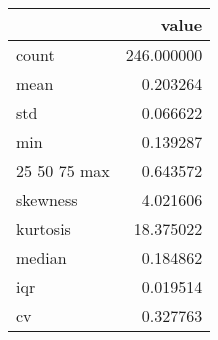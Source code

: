 \begin{tabular}{lr}
\toprule
 & value \\
\midrule
count & 246.000000 \\
mean & 0.203264 \\
std & 0.066622 \\
min & 0.139287 \\
25%
50%
75%
max & 0.643572 \\
skewness & 4.021606 \\
kurtosis & 18.375022 \\
median & 0.184862 \\
iqr & 0.019514 \\
cv & 0.327763 \\
\bottomrule
\end{tabular}

